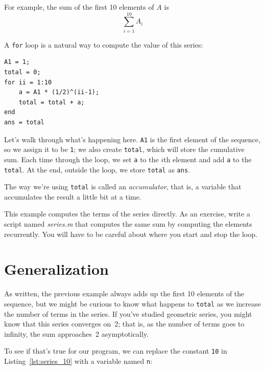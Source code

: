 \documentclass[../../book.tex]{subfiles}
\begin{document}

For example, the sum of the first 10 elements of $A$ is
\begin{equation*}
\sum_{i=1}^{10} A_i
\end{equation*}

A \lstinline{for} loop is a natural way to compute the value of this series:

\begin{lstlisting}[caption={A program that calculates a simple series}, label={lst:series_10}]
A1 = 1;
total = 0;
for ii = 1:10
    a = A1 * (1/2)^(ii-1);
    total = total + a;
end
ans = total
\end{lstlisting}

Let's walk through what's happening here. \lstinline{A1} is the first element of the sequence, so we assign it to be \lstinline{1}; we also create \lstinline{total}, which will store the cumulative sum.
Each time through the loop, we set \lstinline{a} to the $i$th element and add \lstinline{a} to the \lstinline{total}.
At the end, outside the loop, we store  \lstinline{total} as \lstinline{ans}.

The way we're using \lstinline{total} is called an \emph{accumulator}, that is, a variable that accumulates the result a little bit at a time.



\begin{ex}
This example computes the terms of the series directly. As
an exercise, write a script named \emph{series.m} that computes
the same sum by computing the elements recurrently.  You will
have to be careful about where you start and stop the loop.
\end{ex}


\section{Generalization}


As written, the previous example always adds up the first 10
elements of the sequence, but we might be curious to know what
happens to \lstinline{total} as we increase the
number of terms in the series.  If you've studied geometric
series, you might know that this series converges on~2; that is,
as the number of terms goes to infinity, the sum approaches~2 asymptotically.

To see if that's true for our program, we can replace the
constant \lstinline{10} in Listing~\ref{lst:series_10} with a variable named \lstinline{n}:
\end{document}
